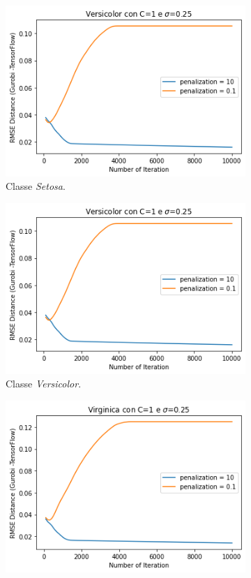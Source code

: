 \documentclass[a4paper,12pt]{report}
\begin{document}
\begin{figure}[H]
    \begin{subfigure}{0.47\textwidth}
        \centering
        \includegraphics[scale=0.5]{images/Grafici/Versicolor_DiffPen_10k.png}
        \caption{Classe \textit{Setosa}.}
        \label{subfig:Setosa_diffPen_10k}
    \end{subfigure}
    \begin{subfigure}{0.47\textwidth}
        \centering
        \includegraphics[scale=0.5]{images/Grafici/Versicolor_DiffPen_10k.png}
        \caption{Classe \textit{Versicolor}.}
        \label{subfig:Versicolor_diffPen_10k}
    \end{subfigure}
    \newline
    \begin{subfigure}{\textwidth}
        \centering
        \includegraphics[scale=0.5]{images/Grafici/Virginica_DiffPen_10k.png}

\end{subfigure}
\end{figure}
\end{document}
